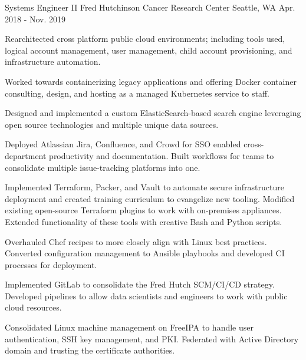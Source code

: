 \begin{cventries}
\cventry
{Systems Engineer II} %
{Fred Hutchinson Cancer Research Center} %
{Seattle, WA} %
{Apr. 2018 - Nov. 2019} %
{ %
\begin{cvitems}
\item {Rearchitected cross platform public cloud environments; including tools used, logical account management, user management, child account provisioning, and infrastructure automation.}
\item {Worked towards containerizing legacy applications and offering Docker container consulting, design, and hosting as a managed Kubernetes service to staff.}
\item {Designed and implemented a custom ElasticSearch-based search engine leveraging open source technologies and multiple unique data sources.}
\item {Deployed Atlassian Jira, Confluence, and Crowd for SSO enabled cross-department productivity and documentation. Built workflows for teams to consolidate multiple issue-tracking platforms into one. }
\item {Implemented Terraform, Packer, and Vault to automate secure infrastructure deployment and created training curriculum to evangelize new tooling. Modified existing open-source Terraform plugins to work with on-premises appliances. Extended functionality of these tools with creative Bash and Python scripts.}
\item {Overhauled Chef recipes to more closely align with Linux best practices. Converted configuration management to Ansible playbooks and developed CI processes for deployment.}
\item {Implemented GitLab to consolidate the Fred Hutch SCM/CI/CD strategy. Developed pipelines to allow data scientists and engineers to work with public cloud resources.}
\item {Consolidated Linux machine management on FreeIPA to handle user authentication, SSH key management, and PKI. Federated with Active Directory domain and trusting the certificate authorities. }
\end{cvitems}
}



\end{cventries}
